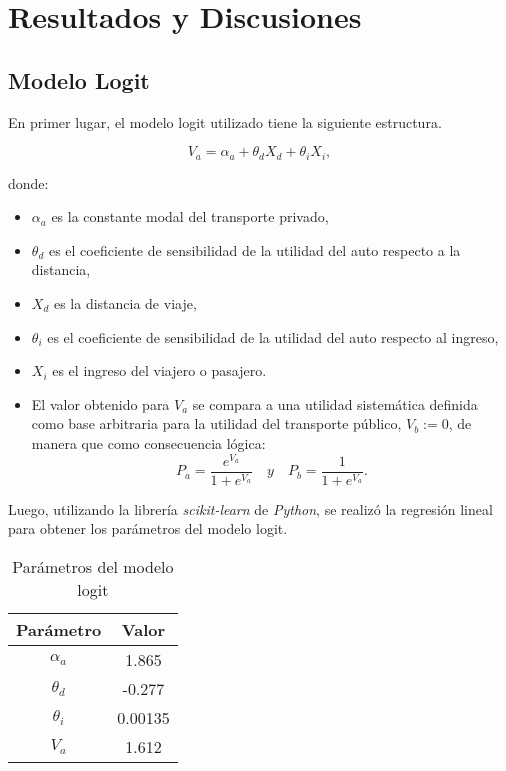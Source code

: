 \section{Resultados y Discusiones}

\subsection{Modelo Logit}

En primer lugar, el modelo logit utilizado tiene la siguiente estructura.

\begin{equation}
    V_a = \alpha_a + \theta_d X_d + \theta_i X_i,
\end{equation}

donde:
\begin{itemize}
    \item $\alpha_a$ es la constante modal del transporte privado,
    \item $\theta_d$ es el coeficiente de sensibilidad de la utilidad del auto respecto a la distancia,
    \item $X_d$ es la distancia de viaje,
    \item $\theta_i$ es el coeficiente de sensibilidad de la utilidad del auto respecto al ingreso,
    \item $X_i$ es el ingreso del viajero o pasajero.
    \item El valor obtenido para $V_a$ se compara a una utilidad sistemática definida como base arbitraria para la utilidad del transporte público, $V_b := 0$, de manera que como consecuencia lógica:
    \begin{equation}
        P_a = \frac{e^{V_a}}{1+e^{V_a}} \quad y \quad P_b = \frac{1}{1+e^{V_a}}.
    \end{equation} 
\end{itemize}
    
Luego, utilizando la librería \textit{scikit-learn} de \textit{Python}, se realizó la regresión lineal para obtener los parámetros del modelo logit.

\begin{table}[H]
    \centering
    \caption{Parámetros del modelo logit}
    \begin{tabular}{|c|c|}
    \hline
    Parámetro & Valor  \\ \hline
    $\alpha_{a}$    & 1.865     \\ \hline
    $\theta_{d}$    & -0.277     \\ \hline
    $\theta_{i}$    & 0.00135     \\ \hline
    $V_{a}$    & 1.612     \\ \hline
    \end{tabular}
    \label{tab:param}
\end{table}

